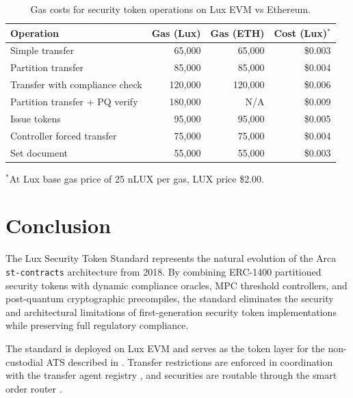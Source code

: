 \documentclass[11pt,a4paper]{article}
\begin{document}
\begin{table}[H]
\centering
\caption{Gas costs for security token operations on Lux EVM vs Ethereum.}
\label{tab:gas}
\begin{tabular}{lrrr}
\toprule
\textbf{Operation} & \textbf{Gas (Lux)} & \textbf{Gas (ETH)} & \textbf{Cost (Lux)$^*$} \\
\midrule
Simple transfer & 65,000 & 65,000 & \$0.003 \\
Partition transfer & 85,000 & 85,000 & \$0.004 \\
Transfer with compliance check & 120,000 & 120,000 & \$0.006 \\
Partition transfer + PQ verify & 180,000 & N/A & \$0.009 \\
Issue tokens & 95,000 & 95,000 & \$0.005 \\
Controller forced transfer & 75,000 & 75,000 & \$0.004 \\
Set document & 55,000 & 55,000 & \$0.003 \\
\bottomrule
\end{tabular}
\end{table}

{\footnotesize $^*$At Lux base gas price of 25 nLUX per gas, LUX price \$2.00.}

\section{Conclusion}

The Lux Security Token Standard represents the natural evolution of the Arca \texttt{st-contracts} architecture from 2018. By combining ERC-1400 partitioned security tokens with dynamic compliance oracles, MPC threshold controllers, and post-quantum cryptographic precompiles, the standard eliminates the security and architectural limitations of first-generation security token implementations while preserving full regulatory compliance.

The standard is deployed on Lux EVM and serves as the token layer for the non-custodial ATS described in \cite{lux-ats-architecture}. Transfer restrictions are enforced in coordination with the transfer agent registry \cite{lux-transfer-agent}, and securities are routable through the smart order router \cite{lux-smart-order-routing}.
\end{document}

